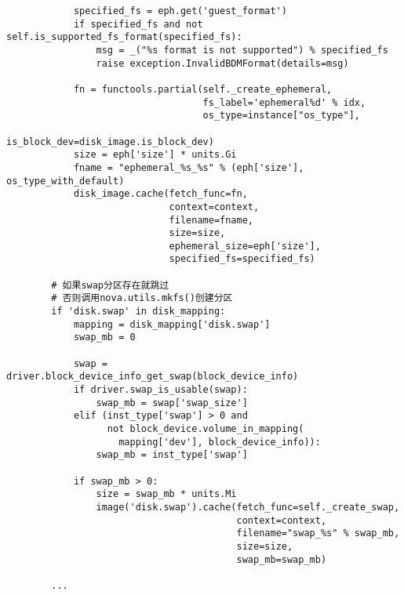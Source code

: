 \documentclass[a4paper,left=1.5cm,right=1.5cm,11pt]{article}
\begin{document}
\begin{lstlisting}
            specified_fs = eph.get('guest_format')
            if specified_fs and not self.is_supported_fs_format(specified_fs):
                msg = _("%s format is not supported") % specified_fs
                raise exception.InvalidBDMFormat(details=msg)

            fn = functools.partial(self._create_ephemeral,
                                   fs_label='ephemeral%d' % idx,
                                   os_type=instance["os_type"],
                                   is_block_dev=disk_image.is_block_dev)
            size = eph['size'] * units.Gi
            fname = "ephemeral_%s_%s" % (eph['size'], os_type_with_default)
            disk_image.cache(fetch_func=fn,
                             context=context,
                             filename=fname,
                             size=size,
                             ephemeral_size=eph['size'],
                             specified_fs=specified_fs)
		
		# 如果swap分区存在就跳过
		# 否则调用nova.utils.mkfs()创建分区
        if 'disk.swap' in disk_mapping:
            mapping = disk_mapping['disk.swap']
            swap_mb = 0

            swap = driver.block_device_info_get_swap(block_device_info)
            if driver.swap_is_usable(swap):
                swap_mb = swap['swap_size']
            elif (inst_type['swap'] > 0 and
                  not block_device.volume_in_mapping(
                    mapping['dev'], block_device_info)):
                swap_mb = inst_type['swap']

            if swap_mb > 0:
                size = swap_mb * units.Mi
                image('disk.swap').cache(fetch_func=self._create_swap,
                                         context=context,
                                         filename="swap_%s" % swap_mb,
                                         size=size,
                                         swap_mb=swap_mb)

        ...
	\end{lstlisting}
\end{document}
